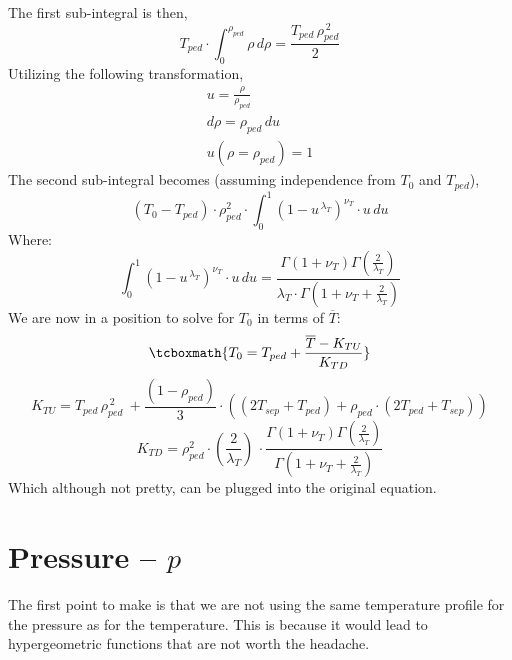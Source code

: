 The first sub-integral is then,
\begin{equation}
	T_{ped} \cdot \int_0^{\rho_{ped}} \rho \, d\rho = \frac{ T_{ped} \, \rho_{ped}^{\,2} }{2}
\end{equation}
Utilizing the following transformation,
\begin{gather}
	u = \frac{\rho}{\rho_{ped}} \\
	d\rho = \rho_{ped} \, du \\
	u( \rho=\rho_{ped} ) = 1
\end{gather}
The second sub-integral becomes (assuming independence from $T_0$ and $T_{ped}$),
\begin{equation}
	( T_{0} - T_{ped} ) \cdot \rho_{ped}^2 \cdot \int_0^{1} \left( 1 - u^{\,\lambda_T} \right)^{\nu_T}  \cdot u \, du
\end{equation}
Where:
\begin{equation}
	\int_0^{1} \left( 1 - u^{\,\lambda_T} \right)^{\nu_T}  \cdot u \, du =  \frac{ \Gamma \left( 1 + \nu_T  \right) \Gamma \left( \frac{2}{\lambda_T} \right) }{ \lambda_T \cdot \Gamma \left( 1 + \nu_T + \frac{2}{\lambda_T} \right) }
\end{equation}
We are now in a position to solve for $T_0$ in terms of $\overline{T}$:
\begin{equation}
	\tcboxmath{
	T_0 = T_{ped} + \frac{ \overline{T} - K_{TU} }{K_{TD}} }
\end{equation}
\begin{equation}
	K_{TU}  =  T_{ped} \, \rho_{ped}^{\,2}  \ +  \frac{ \left( 1 - \rho_{ped} \right ) }{3} \cdot \left( \left( 2 T_{sep} + T_{ped} \right) + \rho_{ped} \cdot \left( 2 T_{ped} + T_{sep}   \right)  \right) 
\end{equation}
\begin{equation}
	K_{TD} = \rho_{ped}^2 \cdot \left( \frac{ 2 }{ \lambda_T } \right) \, \cdot \frac{ \Gamma \left( 1 + \nu_T  \right) \Gamma \left( \frac{2}{\lambda_T} \right) }{ \Gamma \left( 1 + \nu_T + \frac{2}{\lambda_T} \right) }
\end{equation}
Which although not pretty, can be plugged into the original equation.

\section{Pressure -- $p$}

The first point to make is that we are not using the same temperature profile for the pressure as for the temperature. This is because it would lead to hypergeometric functions that are not worth the headache.

